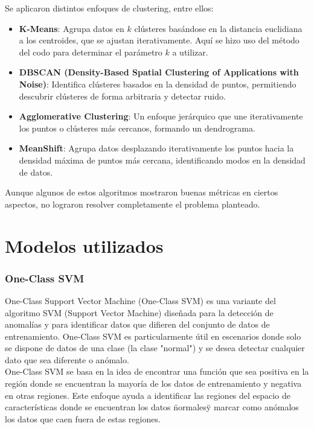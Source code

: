 Se aplicaron distintos enfoques de clustering, entre ellos:
\begin{itemize}
    \item \textbf{K-Means}: Agrupa datos en \(k\) clústeres basándose en la distancia euclidiana a los centroides, que se ajustan iterativamente. Aquí se hizo uso del método del codo para determinar el parámetro \(k\) a utilizar.
    \item \textbf{DBSCAN (Density-Based Spatial Clustering of Applications with Noise)}: Identifica clústeres basados en la densidad de puntos, permitiendo descubrir clústeres de forma arbitraria y detectar ruido.
    \item \textbf{Agglomerative Clustering}: Un enfoque jerárquico que une iterativamente los puntos o clústeres más cercanos, formando un dendrograma.
    \item \textbf{MeanShift}: Agrupa datos desplazando iterativamente los puntos hacia la densidad máxima de puntos más cercana, identificando modos en la densidad de datos.
\end{itemize}

Aunque algunos de estos algoritmos mostraron buenas métricas en ciertos aspectos, no lograron resolver completamente el problema planteado. 

\section{Modelos utilizados}

\subsubsection{One-Class SVM}

One-Class Support Vector Machine (One-Class SVM) es una variante del algoritmo SVM (Support Vector Machine) diseñada para la detección de anomalías y para identificar datos que difieren del conjunto de datos de entrenamiento. One-Class SVM es particularmente útil en escenarios donde solo se dispone de datos de una clase (la clase "normal") y se desea detectar cualquier dato que sea diferente o anómalo.\\

One-Class SVM se basa en la idea de encontrar una función que sea positiva en la región donde se encuentran la mayoría de los datos de entrenamiento y negativa en otras regiones. Este enfoque ayuda a identificar las regiones del espacio de características donde se encuentran los datos \"normales\" y marcar como anómalos los datos que caen fuera de estas regiones.\\

